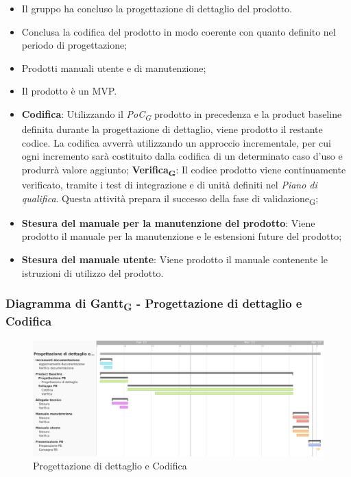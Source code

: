 \:
\begin{itemize}
	\item Il gruppo ha concluso la progettazione di dettaglio del prodotto.
\end{itemize}

\:
\begin{itemize}
	\item Conclusa la codifica del prodotto in modo coerente con quanto definito nel periodo di progettazione;
	\item Prodotti manuali utente e di manutenzione;
	\item Il prodotto è un MVP.
\end{itemize}

\:
\begin{itemize}
	\item \textbf{Codifica}: Utilizzando il \textit{PoC\textsubscript{G}} prodotto in precedenza e la product baseline definita durante la progettazione di dettaglio, viene prodotto il restante codice. La codifica avverrà utilizzando un approccio incrementale, per cui ogni incremento sarà costituito dalla codifica di un determinato caso d’uso e produrrà valore aggiunto;
	\subitem \textbf{Verifica\textsubscript{G}}: Il codice prodotto viene continuamente verificato, tramite i test di integrazione e di unità definiti nel \textit{Piano di qualifica}. Questa attività prepara il successo della fase di validazione\textsubscript{G};
	\item \textbf{Stesura del manuale per la manutenzione del prodotto}: Viene prodotto il manuale per la manutenzione e le estensioni future del prodotto;
	\item \textbf{Stesura del manuale utente}: Viene prodotto il manuale contenente le istruzioni di utilizzo del prodotto.
\end{itemize}

\subsubsection{Diagramma di Gantt\textsubscript{G} - Progettazione di dettaglio e Codifica}

\begin{figure}[H]
\centering
\includegraphics[width=\textwidth]{img/4_codifica.png}
\caption{Progettazione di dettaglio e Codifica}
\end{figure}

